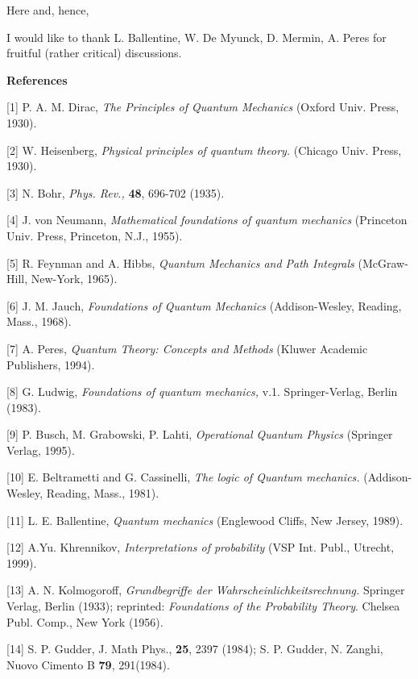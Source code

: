 \documentclass[12pt,oneside,final,a4paper]{article}
\begin{document}
\coordHE{}

Here \coordHE{} and, hence,

\coordHE{}



I would like to thank  L. Ballentine,  W. De Myunck, 
D. Mermin, A. Peres  for fruitful (rather critical) discussions. 

{\bf References}

[1] P. A. M.  Dirac, {\it The Principles of Quantum Mechanics}
(Oxford Univ. Press, 1930).

[2] W. Heisenberg, {\it Physical principles of quantum theory.}
(Chicago Univ. Press, 1930).

[3]  N. Bohr, {\it Phys. Rev.,} {\bf 48}, 696-702 (1935).

[4] J. von Neumann, {\it Mathematical foundations
of quantum mechanics} (Princeton Univ. Press, Princeton, N.J., 1955).

[5] R. Feynman and A. Hibbs, {\it Quantum Mechanics and Path Integrals}
(McGraw-Hill, New-York, 1965).

[6] J. M. Jauch, {\it Foundations of Quantum Mechanics} (Addison-Wesley,
Reading, Mass., 1968).

[7] A. Peres, {\em Quantum Theory: Concepts and Methods} (Kluwer Academic
Publishers, 1994).


[8]  G. Ludwig, {\it Foundations of quantum mechanics,} v.1. Springer-Verlag, Berlin
(1983).

[9] P. Busch, M. Grabowski, P. Lahti, {\it Operational Quantum Physics}
(Springer Verlag, 1995).

[10] E. Beltrametti  and G. Cassinelli, {\it The logic of Quantum mechanics.}
(Addison-Wesley, Reading, Mass., 1981).

[11]  L. E. Ballentine, {\it Quantum mechanics} (Englewood Cliffs, 
New Jersey, 1989).

[12] A.Yu. Khrennikov, {\it Interpretations of 
probability} (VSP Int. Publ., Utrecht, 1999).

[13] A. N. Kolmogoroff, {\it Grundbegriffe der Wahrscheinlichkeitsrechnung.}
Springer Verlag, Berlin (1933); reprinted:
{\it Foundations of the Probability Theory}. 
Chelsea Publ. Comp., New York (1956).

[14] S. P. Gudder,  J. Math Phys., {\bf 25}, 2397 (1984); S. P. Gudder, N.
Zanghi, Nuovo Cimento B {\bf 79}, 291(1984).
\end{document}
